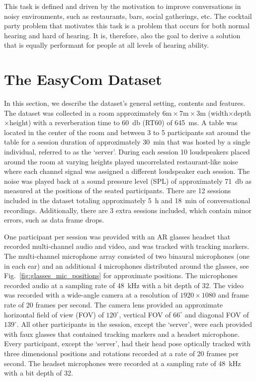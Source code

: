 \documentclass[journal]{IEEEtran}
\begin{document}
This task is defined and driven by the motivation to improve conversations in noisy environments, such as restaurants, bars, social gatherings, etc.
The cocktail party problem that motivates this task is a problem that occurs for both normal hearing and hard of hearing.
It is, therefore, also the goal to derive a solution that is equally performant for people at all levels of hearing ability.
 \section{The EasyCom Dataset} \label{sec:Dataset}
In this section, we describe the dataset's general setting, contents and features.
The dataset was collected in a room approximately $6\mathrm{m}\times 7\mathrm{m}\times 3\mathrm{m}$ (width$\times$depth$\times$height) with a reverberation time to \SI{60}{\decibel} (RT60) of \SI{645}{\milli\second}.
A table was located in the center of the room and between 3 to 5 participants sat around the table for a session duration of approximately \SI{30}{\minute} that was hosted by a single individual, referred to as the `server'.
During each session 10 loudspeakers placed around the room at varying heights played uncorrelated restaurant-like noise where each channel signal was assigned a different loudspeaker each session.
The noise was played back at a sound pressure level (SPL) of approximately \SI{71}{\decibel} as measured at the positions of the seated participants.
There are 12 sessions included in the dataset totaling approximately \SI{5}{\hour} and \SI{18}{\minute} of conversational recordings.
Additionally, there are 3 extra sessions included, which contain minor errors, such as data frame drops.

One participant per session was provided with an AR glasses headset that recorded multi-channel audio and video, and was tracked with tracking markers.
The multi-channel microphone array consisted of two binaural microphones (one in each ear) and an additional 4 microphones distributed around the glasses, see Fig.~\ref{fig:glasses_mic_positions} for approximate positions.
The microphones recorded audio at a sampling rate of \SI{48}{\kilo\hertz} with a bit depth of 32.
The video was recorded with a wide-angle camera at a resolution of $1920 \times 1080$ and frame rate of 20 frames per second.
The camera lens provided an approximate horizontal field of view (FOV) of $120^\circ$, vertical FOV of $66^\circ$ and diagonal FOV of $139^\circ$.
All other participants in the session, except the `server', were each provided with faux glasses that contained tracking markers and a headset microphone.
Every participant, except the `server', had their head pose optically tracked with three dimensional positions and rotations recorded at a rate of 20 frames per second.
The headset microphones were recorded at a sampling rate of \SI{48}{\kilo\hertz} with a bit depth of 32.
\end{document}
